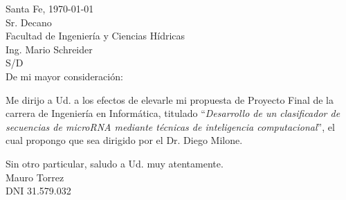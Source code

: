 \documentclass[a4paper,11pt,oneside]{article}
\begin{document}

Santa Fe, \today\\[2em]
%
Sr. Decano\\
Facultad de Ingeniería y Ciencias Hídricas\\
{Ing. Mario Schreider}\\
S/D\\[2em]
%
De mi mayor consideración:

Me dirijo a Ud. a los efectos de elevarle mi propuesta de Proyecto
Final de la carrera de Ingeniería en Informática, titulado
``\emph{Desarrollo de un clasificador de secuencias de
 micro\-RNA mediante técnicas de inteligencia computacional}'', el cual
propongo que sea dirigido por el Dr. Diego Milone.

Sin otro particular, saludo a Ud. muy atentamente.\\[8em]

{Mauro Torrez}\\
DNI 31.579.032
%
\end{document}
